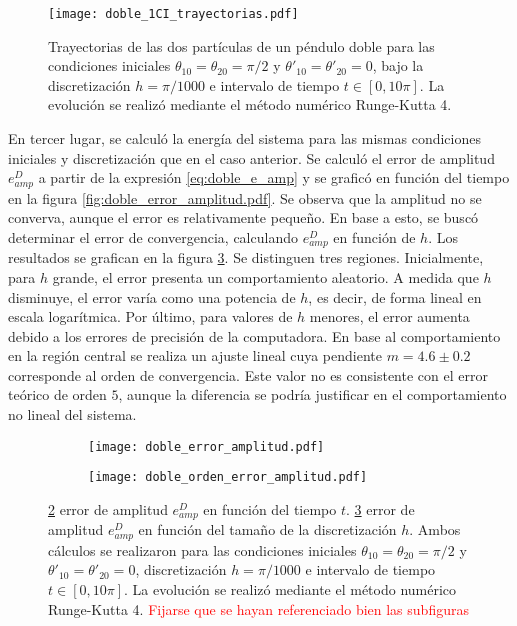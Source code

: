 \documentclass[aps,prb,twocolumn,superscriptaddress,floatfix,longbibliography]{revtex4-2}
\newcounter{para}
\begin{document}
\begin{figure}[h]
  \texttt{[image: doble\_1CI\_trayectorias.pdf]}
  \caption{Trayectorias de las dos partículas de un péndulo doble para las condiciones iniciales  $\theta_{1 0} = \theta_{2 0} = \pi/2$ y $\theta'_{1 0} = \theta'_{2 0} = 0$, bajo la discretización $h = \pi/1000$ e intervalo de tiempo $t \in [0, 10 \pi]$. La evolución se realizó mediante el método numérico Runge-Kutta 4.}
   \label{fig:doble_1CI_trayectorias}
\end{figure}

En tercer lugar, se calculó la energía del sistema para las mismas condiciones iniciales y discretización que en el caso anterior. Se calculó el error de amplitud $e_{amp}^D$ a partir de la expresión \ref{eq:doble_e_amp} y se graficó en función del tiempo en la figura \ref{fig:doble_error_amplitud.pdf}. Se observa que la amplitud no se converva, aunque el error es relativamente pequeño. En base a esto, se buscó determinar el error de convergencia, calculando $e_{amp}^D$ en función de $h$. Los resultados se grafican en la figura \ref{fig:doble_orden_error_amplitud}. Se distinguen tres regiones. Inicialmente, para $h$ grande,
el error presenta un comportamiento aleatorio. A medida que $h$ disminuye, el error varía como una potencia de $h$, es decir, de forma lineal en escala logarítmica. Por
último, para valores de $h$ menores, el error aumenta debido a los errores de precisión de la computadora. En base al comportamiento en la región central se realiza un ajuste lineal cuya pendiente $m = 4.6 \pm 0.2$ corresponde al orden de convergencia. Este valor no es consistente con el error teórico de orden $5$, aunque la diferencia se podría justificar en el comportamiento no lineal del sistema.



\begin{figure}
  \centering
  \begin{subfigure}[b]{0.45\textwidth}
      \centering
      \texttt{[image: doble\_error\_amplitud.pdf]}
      \caption{\label{fig:doble_error_amplitud}}
  \end{subfigure}
  \hfill
  \begin{subfigure}[b]{0.45\textwidth}
      \centering
      \texttt{[image: doble\_orden\_error\_amplitud.pdf]}
      \caption{\label{fig:doble_orden_error_amplitud}}
  \end{subfigure}
     \caption{\ref{fig:doble_error_amplitud} error de amplitud  $e_{amp}^D$ en función del tiempo $t$. \ref{fig:doble_orden_error_amplitud} error de amplitud  $e_{amp}^D$ en función del tamaño de la discretización $h$. Ambos cálculos se realizaron para las condiciones iniciales $\theta_{1 0} = \theta_{2 0} = \pi/2$ y $\theta'_{1 0} = \theta'_{2 0} = 0$, discretización $h = \pi/1000$ e intervalo de tiempo $t \in [0, 10 \pi]$. La evolución se realizó mediante el método numérico Runge-Kutta 4. \textcolor{red}{Fijarse que se hayan referenciado bien las subfiguras}}
     \label{fig:doble_e_amp}
\end{figure}
\end{document}
